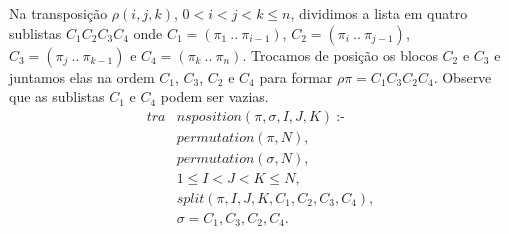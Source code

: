 Na transposição $\rho(i,j,k)$, $0 < i < j < k\leq n$, dividimos a
lista em quatro sublistas $C_{1}C_{2}C_{3}C_{4}$ onde $C_{1} =
(\pi_{1}~..~\pi_{i-1})$, $C_{2} = (\pi_{i}~..~\pi_{j-1})$, $C_{3} =
(\pi_{j}~..~\pi_{k-1})$ e $C_{4} = (\pi_{k}~..~\pi_{n})$. Trocamos de
posição os blocos $C_{2}$ e $C_{3}$ e juntamos elas na ordem $C_{1}$,
$C_{3}$, $C_{2}$ e $C_{4}$ para formar $\rho\pi =
C_{1}C_{3}C_{2}C_{4}$. Observe que as sublistas $C_{1}$ e $C_{4}$
podem ser vazias.
\begin{align}
  \label{transposition}
  \textit{tra}&\textit{nsposition}(\pi, \sigma, I, J, K)~\text{:-} \nonumber\\
  &\textit{permutation}(\pi, N), \nonumber\\
  &\textit{permutation}(\sigma, N), \\
  &1 \le I < J < K \le N, \nonumber \\
  &\textit{split}(\pi, I, J, K, C_{1}, C_{2}, C_{3}, C_{4}), \nonumber\\
  &\sigma = C_{1}, C_{3}, C_{2}, C_{4}. \nonumber
\end{align}

